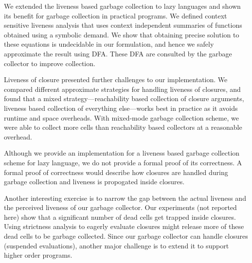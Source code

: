 \documentclass[9pt]{sigplanconf}
\begin{document}

We extended the liveness based garbage collection to lazy
  languages and shown its benefit  for garbage collection in practical
  programs. We  defined context  sensitive liveness analysis  that uses
  context independent summaries of functions obtained using a symbolic
  demand. We show  that obtaining precise solution  to these equations
  is undecidable in  our formulation, and hence  we safely approximate
  the result using DFA. These DFA are consulted by the garbage collector
  to improve  collection.

  Liveness   of   closure   presented  further   challenges   to   our
  implementation.   We compared  different approximate  strategies for
  handling   liveness   of   closures,   and  found   that   a   mixed
  strategy---reachability  based  collection   of  closure  arguments,
  liveness  based  collection  of   everything  else---works  best  in
  practice as it  avoids runtime and space  overheads.  With mixed-mode
  garbage collection scheme,  we were able to collect  more cells than
  reachability based collectors at a reasonable overhead.

  Although we  provide an  implementation for  a liveness  based garbage
  collection scheme for lazy language, we  do not provide a formal proof
  of its correctness.  A formal  proof of correctness would describe how
  closures  are  handled  during  garbage  collection  and  liveness  is
  propogated inside closures. 

  Another interesting exercise is to narrow the gap between the actual
  liveness and  the perceived liveness  of our garbage  collector. Our
  experiments (not  reported here) show  that a significant  number of
  dead cells  get trapped inside closures.   Using strictness analysis
  to eagerly evaluate closures might  release more of these dead cells
  to be  garbage collected.   Since our  garbage collector  can handle
  closures  (suspended evaluations),  another  major  challenge is  to
  extend it to support higher order programs.
\end{document}

